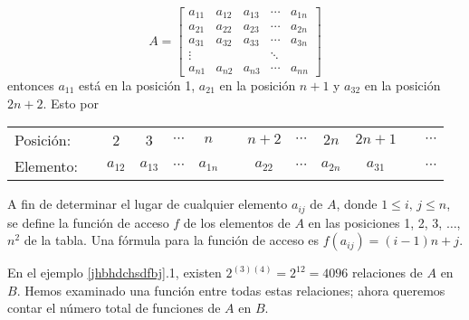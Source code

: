 \begin{myexample}
\begin{enumerate}[label=\alph*)]
        $$A = \begin{bmatrix}
            a_{11} & a_{12} & a_{13} & \cdots & a_{1n}\\
            a_{21} & a_{22} & a_{23} & \cdots & a_{2n}\\
            a_{31} & a_{32} & a_{33} & \cdots & a_{3n}\\
            \vdots & & & \ddots & \\
            a_{n1} & a_{n2} & a_{n3} & \cdots & a_{nn}
        \end{bmatrix}$$
        entonces $a_{11}$ está en la posición 1, $a_{21}$ en la posición $n + 1$ y $a_{32}$ en la posición $2n + 2$. Esto por
        \begin{center}
            \begin{tabular}{lcccccccccccc}
                Posición: & \cellcolor{DodgerBlue3!40}{1} & 2 & 3 & $ \cdots$ & $n$ & \cellcolor{DodgerBlue3!40}{$n+1$} & $n+2$ & $\cdots$ & $2n$ & $2n+1$ & \cellcolor{DodgerBlue3!40}{$2n+2$} & $\cdots$ \\
                Elemento: & \cellcolor{DodgerBlue3!40}{$a_{11}$} & $a_{12}$ & $a_{13}$ & $\cdots$ & $a_{1n}$ & \cellcolor{DodgerBlue3!40}{$a_{21}$} & $a_{22}$ & $\cdots$ & $a_{2n}$ & $a_{31}$ & \cellcolor{DodgerBlue3!40}{$a_{32}$} & $\cdots$
            \end{tabular}
        \end{center}
        A fin de determinar el lugar de cualquier elemento $a_{ij}$ de $A$, donde $1 \leq i, \, j \leq n$, se define la función de acceso $f$ de los elementos de $A$ en las posiciones 1, 2, 3, $\dots$, $n^2$ de la tabla. Una fórmula para la función de acceso es $f(a_{ij}) = (i - 1)n+j$.
    \end{enumerate}
\end{myexample}

\newpage

En el ejemplo \ref{jhbhdchsdfbj}.1, existen $2^{(3)(4)} = 2^{12} = 4096$ relaciones de $A$ en $B$. Hemos examinado una función entre todas estas relaciones; ahora queremos contar el número total de funciones de $A$ en $B$.

